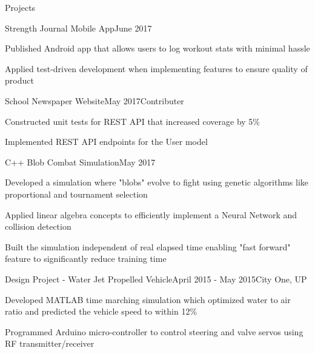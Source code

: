 \documentclass{resume} %
\begin{document}
\begin{rSection}{Projects}
\begin{rSubsection}{Strength Journal Mobile App}{June 2017}{}{}
\item Published Android app that allows users to log workout stats with minimal hassle
\item Applied test-driven development when implementing features to ensure quality of product
\end{rSubsection}
\begin{rSubsection}{School Newspaper Website}{May 2017}{Contributer}{}
\item Constructed unit tests for REST API that increased coverage by 5\%
\item Implemented REST API endpoints for the User model 
\end{rSubsection}
\begin{rSubsection}{C++ Blob Combat Simulation}{May 2017}{}{}
\item Developed a simulation where "blobs" evolve to fight using genetic algorithms like proportional and tournament selection
\item Applied linear algebra concepts to efficiently implement a Neural Network and collision detection
\item Built the simulation independent of real elapsed time enabling "fast forward" feature to significantly reduce training time  
\end{rSubsection}
\iffalse
\begin{rSubsection}{UUP SIAM - Direct Tap Machine Learning}{April 2017 - Present}{}{City One, UP}
\item Built a model to visualize the correlation between order quantity and seasonality, using Python pandas and matplotlib
\end{rSubsection}
\fi
\begin{rSubsection}{Design Project - Water Jet Propelled Vehicle}{April 2015 - May 2015}{}{City One, UP}
\item Developed MATLAB time marching simulation which optimized water to air ratio and predicted the vehicle speed to within 12\%
\item Programmed Arduino micro-controller to control steering and valve servos using RF transmitter/receiver
\end{rSubsection}
\iffalse
\begin{rSubsection}{JavaScript 8 Puzzle Solver}{December 2016}{}{}
\item Developed a sliding puzzle solver in pure JavaScript to animate a step by step solution
\item Is able to solve 3x3 tile board in less than 1 second using the A* algorithm
\end{rSubsection}
\fi
\end{rSection}
\end{document}

